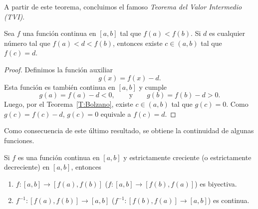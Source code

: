 A partir de este teorema, concluimos el famoso \emph{Teorema del Valor Intermedio (TVI)}.

\begin{corollary}\label{TVI}
Sea $f$ una función continua en $[a,b]$ tal que $f(a)<f(b)$.
Si $d$ es cualquier número tal que $f(a)<d<f(b)$, entonces existe $c\in(a,b)$ tal que $f(c)=d$.
\end{corollary}

\begin{proof}
    Definimos la función auxiliar
    \[
    g(x) = f(x)-d.
    \]
    Esta función es también continua en $[a,b]$ y cumple 
    \[
    g(a) = f(a)-d < 0,
    \qquad\text{y}\qquad
    g(b) = f(b)-d > 0.
    \]
    Luego, por el Teorema~\ref{T:Bolzano}, existe $c\in(a,b)$ tal que $g(c)=0$.
    Como $g(c)=f(c)-d$, $g(c)=0$ equivale a $f(c)=d$.
\end{proof}

Como consecuencia de este último resultado, se obtiene la continuidad de algunas funciones.

\begin{theorem}
Si $f$ es una función continua en $[a,b]$ y estrictamente creciente (o estrictamente decreciente) en $[a,b]$, entonces
\begin{enumerate}[{\bf (a)}]
    \item $f:[a,b]\to[f(a),f(b)]$ ($f:[a,b]\to[f(b),f(a)]$) es biyectiva.
    \item $f^{-1}:[f(a),f(b)]\to [a,b]$ ($f^{-1}:[f(b),f(a)]\to [a,b]$) es continua.
\end{enumerate}
\end{theorem}

